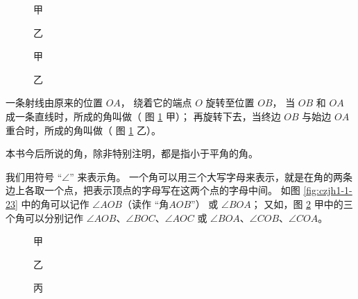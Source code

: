 \begin{figure}[htbp]
    \centering
    \begin{minipage}[b]{6cm}
        \centering
        \begin{minipage}[b]{2.7cm}
            \centering
            
            \caption*{甲}
        \end{minipage}
        \quad
        \begin{minipage}[b]{2.7cm}
            \centering
            
            \caption*{乙}
        \end{minipage}
        \caption{}\label{fig:czjh1-1-23}
    \end{minipage}
    \qquad
    \begin{minipage}[b]{8cm}
        \centering
        \begin{minipage}[b]{4cm}
            \centering
            
            \caption*{甲}
        \end{minipage}
        \quad
        \begin{minipage}[b]{3cm}
            \centering
            
            \caption*{乙}
        \end{minipage}
        \caption{}\label{fig:czjh1-1-24}
    \end{minipage}
\end{figure}

一条射线由原来的位置 $OA$， 绕着它的端点 $O$ 旋转至位置 $OB$，
当 $OB$ 和 $OA$ 成一条直线时，所成的角叫做（ 图 \ref{fig:czjh1-1-24} 甲）；
再旋转下去，当终边 $OB$ 与始边 $OA$ 重合时，所成的角叫做（ 图 \ref{fig:czjh1-1-24} 乙）。

本书今后所说的角，除非特别注明，都是指小于平角的角。

我们用符号 “$\angle$” 来表示角。
一个角可以用三个大写字母来表示，就是在角的两条边上各取一个点，把表示顶点的字母写在这两个点的字母中间。
如图 \ref{fig:czjh1-1-23} 中的角可以记作 $\angle AOB$（读作 “角$AOB$”） 或 $\angle BOA$；
又如，图 \ref{fig:czjh1-1-25} 甲中的三个角可以分别记作 $\angle AOB$、$\angle BOC$、$\angle AOC$
或 $\angle BOA$、$\angle COB$、$\angle COA$。

\begin{figure}[htbp]
    \centering
    \begin{minipage}[b]{4cm}
        \centering
        
        \caption*{甲}
    \end{minipage}
    \qquad
    \begin{minipage}[b]{4cm}
        \centering
        
        \caption*{乙}
    \end{minipage}
    \begin{minipage}[b]{4cm}
        \centering
        
        \caption*{丙}
    \end{minipage}
    \caption{}\label{fig:czjh1-1-25}
\end{figure}

